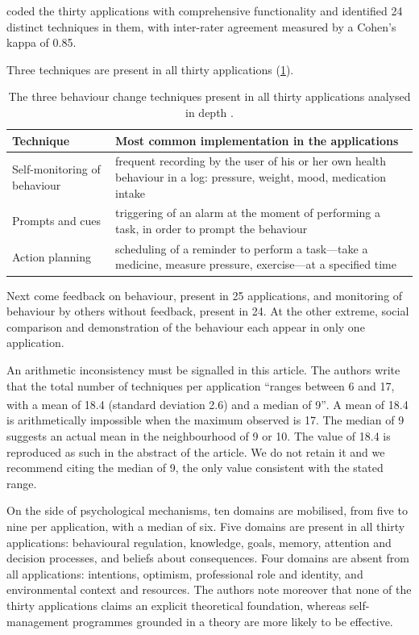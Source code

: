 \documentclass[12pt,a4paper,oneside]{report}
\newcommand{\bq}[1]{``#1''\textsuperscript{\dag}}
\begin{document}
\textcite{alessa2019} coded the thirty applications with comprehensive functionality and identified 24 distinct techniques in them, with inter-rater agreement measured by a Cohen's kappa of 0.85.

Three techniques are present in all thirty applications (\cref{tab:bct-apps}).

\begin{table}[htbp]
\centering\small
\caption{The three behaviour change techniques present in all thirty applications analysed in depth \parencite{alessa2019}.}\label{tab:bct-apps}
\begin{tabularx}{\textwidth}{@{}>{\raggedright\arraybackslash}p{4.0cm} X@{}}
\toprule
\textbf{Technique} & \textbf{Most common implementation in the applications} \\
\midrule
Self-monitoring of behaviour & frequent recording by the user of his or her own health behaviour in a log: pressure, weight, mood, medication intake \\
Prompts and cues & triggering of an alarm at the moment of performing a task, in order to prompt the behaviour \\
Action planning & scheduling of a reminder to perform a task---take a medicine, measure pressure, exercise---at a specified time \\
\bottomrule
\end{tabularx}
\end{table}

Next come feedback on behaviour, present in 25 applications, and monitoring of behaviour by others without feedback, present in 24. At the other extreme, social comparison and demonstration of the behaviour each appear in only one application.

An arithmetic inconsistency must be signalled in this article. The authors write that the total number of techniques per application \bq{ranges between 6 and 17, with a mean of 18.4 (standard deviation 2.6) and a median of 9}. A mean of 18.4 is arithmetically impossible when the maximum observed is 17. The median of 9 suggests an actual mean in the neighbourhood of 9 or 10. The value of 18.4 is reproduced as such in the abstract of the article. We do not retain it and we recommend citing the median of 9, the only value consistent with the stated range.

On the side of psychological mechanisms, ten domains are mobilised, from five to nine per application, with a median of six. Five domains are present in all thirty applications: behavioural regulation, knowledge, goals, memory, attention and decision processes, and beliefs about consequences. Four domains are absent from all applications: intentions, optimism, professional role and identity, and environmental context and resources. The authors note moreover that none of the thirty applications claims an explicit theoretical foundation, whereas self-management programmes grounded in a theory are more likely to be effective.
\end{document}
